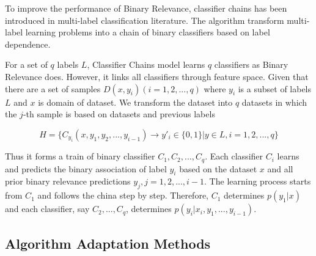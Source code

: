 To improve the performance of Binary Relevance, classifier chains has been introduced in multi-label classification literature\citep{read2011classifier}. The algorithm transform multi-label learning problems into a chain of binary classifiers based on label dependence.

For a set of $q$ labels $L$, Classifier Chains model learns $q$ classifiers as Binary Relevance does. However, it links all classifiers through feature space. Given that there are a set of samples $D(x,y_{i}) (i = 1,2,...,q)$ where $y_{i}$ is a subset of labels $L$ and $x$ is domain of dataset. We transform the dataset into $q$ datasets in which the $j$-th sample is based on datasets and previous labels

\begin{equation}\label{eq:ClassifierChains}
H = \{C_{y_{i}}(x, y_{1},y_{2},...,y_{i-1}) \to y'_{i} \in \{0,1\}| y \in L, i = 1,2,...,q\}
\end{equation}

Thus it forms a train of binary classifier $C_{1},C_{2},...,C_{q}$. Each classifier $C_{i}$ learns and predicts the binary association of label $y_{i}$ based on the dataset $x$ and all prior binary relevance predictions $y_{j}, j = 1,2,...,i-1$. The learning process starts from $C_{1}$ and follows the china step by step. Therefore, $C_{1}$ determines $p(y_{1}|x)$ and each classifier, say $C_{2},...,C_{q}$, determines $p(y_{i}|x_{i},y_{1},...,y_{i-1})$.


\subsection{Algorithm Adaptation Methods}
